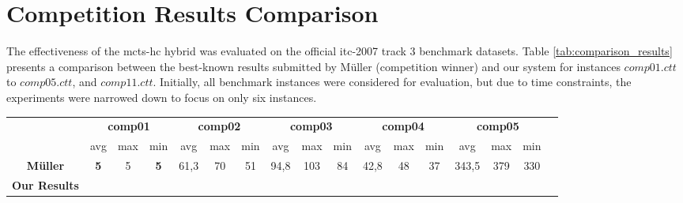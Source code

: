 \section{Competition Results Comparison}

The effectiveness of the \ac{mcts}-\ac{hc} hybrid was evaluated on the official \ac{itc-2007} track 3 benchmark datasets. Table \ref{tab:comparison_results} presents a comparison between the best-known results submitted by Müller (competition winner) and our system for instances \(comp01.ctt\) to \(comp05.ctt\), and \(comp11.ctt\). Initially, all benchmark instances were considered for evaluation, but due to time constraints, the experiments were narrowed down to focus on only six instances.

\begin{table}[h!]
\centering
\footnotesize
\begin{tabular}{ccccccccccccccccc}
\hline
& \multicolumn{3}{c}{\textbf{comp01}} & \multicolumn{3}{c}{\textbf{comp02}} & \multicolumn{3}{c}{\textbf{comp03}} & \multicolumn{3}{c}{\textbf{comp04}} & \multicolumn{3}{c}{\textbf{comp05}} \\
& avg & max & min & avg & max & min & avg & max & min & avg & max & min & avg & max & min \\
\textbf{Müller} & \textbf{5} & 5 & \textbf{5} & 61,3 & 70 & 51 & 94,8 & 103 & 84 & 42,8 & 48 & 37 & 343,5 & 379 & 330 \\
\textbf{Our Results} & & & & & & & & & & & & & & & \\
\end{tabular}


\end{table}
